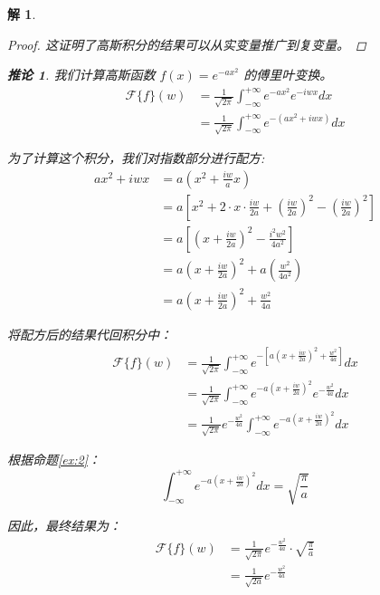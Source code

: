 \documentclass[12pt,a4paper]{article}
\newtheorem*{solution}{解}
\newtheorem{corollary}{推论}
\begin{document}
\begin{solution}
\begin{proof}
	这证明了高斯积分的结果可以从实变量推广到复变量。
	
\end{proof}




\begin{corollary}
	我们计算高斯函数 $f(x) = e^{-ax^2}$ 的傅里叶变换。
	\begin{align*}
		\mathcal{F}\{f\}(w) &= \frac{1}{\sqrt{2\pi}} \int_{-\infty}^{+\infty} e^{-ax^2} e^{-iwx} dx \\
		&= \frac{1}{\sqrt{2\pi}} \int_{-\infty}^{+\infty} e^{-(ax^2 + iwx)} dx
	\end{align*}
\end{corollary}


为了计算这个积分，我们对指数部分进行配方:
\begin{align*}
	ax^2 + iwx &= a\left(x^2 + \frac{iw}{a}x\right) \\
	&= a\left[ x^2 + 2 \cdot x \cdot \frac{iw}{2a} + \left(\frac{iw}{2a}\right)^2 - \left(\frac{iw}{2a}\right)^2 \right] \\
	&= a\left[ \left(x + \frac{iw}{2a}\right)^2 - \frac{i^2w^2}{4a^2} \right] \\
	&= a\left(x + \frac{iw}{2a}\right)^2 + a\left(\frac{w^2}{4a^2}\right) \\
	&= a\left(x + \frac{iw}{2a}\right)^2 + \frac{w^2}{4a}
\end{align*}

将配方后的结果代回积分中：
\begin{align*}
	\mathcal{F}\{f\}(w) &= \frac{1}{\sqrt{2\pi}} \int_{-\infty}^{+\infty} e^{ - \left[ a\left(x + \frac{iw}{2a}\right)^2 + \frac{w^2}{4a} \right] } dx \\
	&= \frac{1}{\sqrt{2\pi}} \int_{-\infty}^{+\infty} e^{-a\left(x + \frac{iw}{2a}\right)^2} e^{-\frac{w^2}{4a}} dx \\
	&= \frac{1}{\sqrt{2\pi}} e^{-\frac{w^2}{4a}} \int_{-\infty}^{+\infty} e^{-a\left(x + \frac{iw}{2a}\right)^2} dx
\end{align*}

根据命题\eqref{ex:2}：
\begin{equation*}
	\int_{-\infty}^{+\infty} e^{-a\left(x + \frac{iw}{2a}\right)^2} dx  = \sqrt{\frac{\pi}{a}}
\end{equation*}

因此，最终结果为：
\begin{align*}
	\mathcal{F}\{f\}(w) &= \frac{1}{\sqrt{2\pi}} e^{-\frac{w^2}{4a}} \cdot \sqrt{\frac{\pi}{a}} \\
	&= \frac{1}{\sqrt{2a}} e^{-\frac{w^2}{4a}}
\end{align*}







\end{solution}
\end{document}

